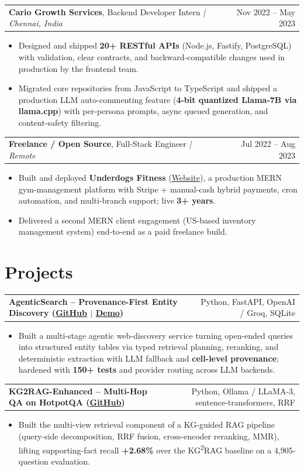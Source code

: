 \documentclass[letterpaper,11pt]{article}
\makeatletter
\newcommand{\expItem}[4]{%
  \vspace{2pt}
  \begin{tabular*}{\textwidth}{@{}l@{\extracolsep{\fill}}r@{}}
    \textbf{#1}, #2 \textit{| #3} & #4 \\
  \end{tabular*}\par\vspace{-2pt}
}
\newcommand{\projItem}[2]{%
  \vspace{4pt}
  \begin{tabular*}{\textwidth}{@{}l@{\extracolsep{\fill}}r@{}}
    \textbf{#1} & #2 \\
  \end{tabular*}\par\vspace{-2pt}
}
\makeatother
\begin{document}
\expItem{Cario Growth Services}{Backend Developer Intern}{Chennai, India}{Nov 2022 -- May 2023}
\begin{itemize}
  \item Designed and shipped \textbf{20+ RESTful APIs} (Node.js, Fastify, PostgreSQL) with validation, clear contracts, and backward-compatible changes used in production by the frontend team.
  \item Migrated core repositories from JavaScript to TypeScript and shipped a production LLM auto-commenting feature (\textbf{4-bit quantized Llama-7B via llama.cpp}) with per-persona prompts, async queued generation, and content-safety filtering.
\end{itemize}

\expItem{Freelance / Open Source}{Full-Stack Engineer}{Remote}{Jul 2022 -- Aug 2023}
\begin{itemize}
  \item Built and deployed \textbf{Underdogs Fitness} (\href{https://www.underdogsfitness.in/}{Website}), a production MERN gym-management platform with Stripe + manual-cash hybrid payments, cron automation, and multi-branch support; live \textbf{3+ years}.
  \item Delivered a second MERN client engagement (US-based inventory management system) end-to-end as a paid freelance build.
\end{itemize}

\section{Projects}

\projItem{AgenticSearch -- Provenance-First Entity Discovery {\normalfont\small(\href{https://github.com/Deva-1903/ciir_agentic_search}{GitHub} $\vert$ \href{https://agentic-search-negglszkwa-uc.a.run.app}{Demo})}}{Python, FastAPI, OpenAI / Groq, SQLite}
\begin{itemize}
  \item Built a multi-stage agentic web-discovery service turning open-ended queries into structured entity tables via typed retrieval planning, reranking, and deterministic extraction with LLM fallback and \textbf{cell-level provenance}; hardened with \textbf{150+ tests} and provider routing across LLM backends.
\end{itemize}

\projItem{KG2RAG-Enhanced -- Multi-Hop QA on HotpotQA {\normalfont\small(\href{https://github.com/Deva-1903/KG2RAG-685-NLP}{GitHub})}}{Python, Ollama / LLaMA-3, sentence-transformers, RRF}
\begin{itemize}
  \item Built the multi-view retrieval component of a KG-guided RAG pipeline (query-side decomposition, RRF fusion, cross-encoder reranking, MMR), lifting supporting-fact recall \textbf{+2.68\%} over the KG\textsuperscript{2}RAG baseline on a 4{,}905-question evaluation.
\end{itemize}
\end{document}
